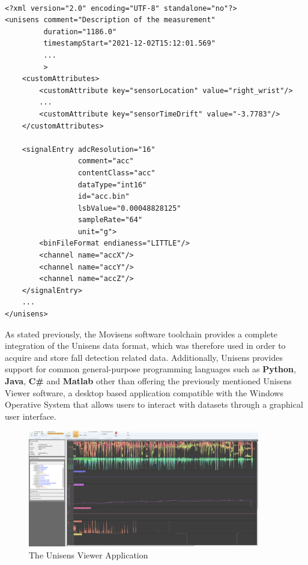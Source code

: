 \begin{verbatim}

<?xml version="2.0" encoding="UTF-8" standalone="no"?>
<unisens comment="Description of the measurement" 
         duration="1186.0"
         timestampStart="2021-12-02T15:12:01.569"
         ...
         >
    <customAttributes>
        <customAttribute key="sensorLocation" value="right_wrist"/>
        ...
        <customAttribute key="sensorTimeDrift" value="-3.7783"/>
    </customAttributes>

    <signalEntry adcResolution="16"
                 comment="acc"
                 contentClass="acc"
                 dataType="int16"
                 id="acc.bin"
                 lsbValue="0.00048828125"
                 sampleRate="64"
                 unit="g">
        <binFileFormat endianess="LITTLE"/>
        <channel name="accX"/>
        <channel name="accY"/>
        <channel name="accZ"/>
    </signalEntry>
    ...
</unisens>
\end{verbatim}

As stated previously, the Movisens software toolchain provides a complete integration of the Unisens data format, which was therefore used in order to acquire and store fall detection related data. Additionally, Unisens provides support for common general-purpose programming languages such as \textbf{Python}, \textbf{Java}, \textbf{C\#} and \textbf{Matlab} other than offering the previously mentioned Unisens Viewer software, a desktop based application compatible with the Windows Operative System that allows users to interact with datasets through a graphical user interface. 

\begin{figure}[htp]
    \centering
    \includegraphics[width=0.9\textwidth]{./images/unisens_viewer.png}
    \caption{The Unisens Viewer Application}
    \label{fig:unisens-viewer-gui}
\end{figure}

